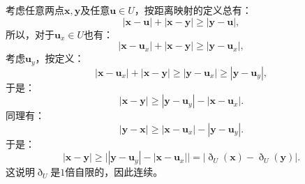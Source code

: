 \documentclass[12pt,UTF8,fontset=none]{ctexbook}
\begin{document}
\begin{so}
    考虑任意两点$\mathbf{x}, \mathbf{y}$及任意$\mathbf{u}\in U$，按距离映射的定义总有：
    $$ |\mathbf{x} - \mathbf{u}| + |\mathbf{x} - \mathbf{y}| \geqslant |\mathbf{y} - \mathbf{u}|,$$
    所以，对于$\mathbf{u}_x \in U$也有：
    $$ |\mathbf{x} - \mathbf{u}_x| + |\mathbf{x} - \mathbf{y}| \geqslant |\mathbf{y} - \mathbf{u}_x|,$$
    考虑$\mathbf{u}_y$，按定义：
    $$ |\mathbf{x} - \mathbf{u}_x| + |\mathbf{x} - \mathbf{y}| \geqslant |\mathbf{y} - \mathbf{u}_x| \geqslant |\mathbf{y} - \mathbf{u}_y|,$$
    于是：
    $$ |\mathbf{x} - \mathbf{y}| \geqslant |\mathbf{y} - \mathbf{u}_y| - |\mathbf{x} - \mathbf{u}_x|. $$
    同理有：
    $$ |\mathbf{y} - \mathbf{x}| \geqslant |\mathbf{x} - \mathbf{u}_x| - |\mathbf{y} - \mathbf{u}_y|. $$
    于是：
    $$ |\mathbf{x} - \mathbf{y}| \geqslant \big||\mathbf{y} - \mathbf{u}_y| - |\mathbf{x} - \mathbf{u}_x|\big| = \left|\eth_{U}(\mathbf{x}) - \eth_{U}(\mathbf{y})\right|. $$
    这说明$\eth_{U}$是$1$倍自限的，因此连续。

\end{so}

\begin{sk}
    
\end{sk}
\end{document}
